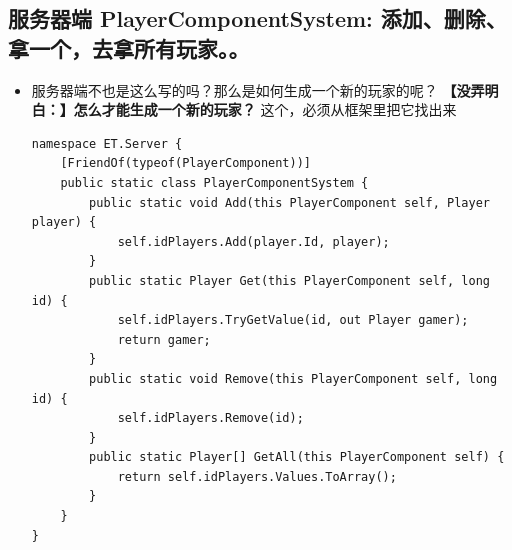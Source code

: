 \documentclass[9pt, b5paper]{article}
\begin{document}
\subsection{服务器端 PlayerComponentSystem: 添加、删除、拿一个，去拿所有玩家。。}
\label{sec-9-6}
\begin{itemize}
\item 服务器端不也是这么写的吗？那么是如何生成一个新的玩家的呢？ \textbf{【没弄明白：】怎么才能生成一个新的玩家？} 这个，必须从框架里把它找出来
\begin{verbatim}
namespace ET.Server {
    [FriendOf(typeof(PlayerComponent))]
    public static class PlayerComponentSystem {
        public static void Add(this PlayerComponent self, Player player) {
            self.idPlayers.Add(player.Id, player);
        }
        public static Player Get(this PlayerComponent self, long id) {
            self.idPlayers.TryGetValue(id, out Player gamer);
            return gamer;
        }
        public static void Remove(this PlayerComponent self, long id) {
            self.idPlayers.Remove(id);
        }
        public static Player[] GetAll(this PlayerComponent self) {
            return self.idPlayers.Values.ToArray();
        }
    }
}
\end{verbatim}
\end{itemize}
\end{document}
